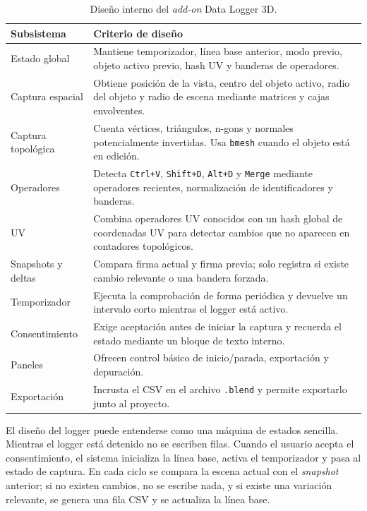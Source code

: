 \begin{table}[H]
\centering
\scriptsize
\renewcommand{\arraystretch}{1.15}
\begin{tabularx}{\textwidth}{p{3.6cm}X}
\toprule
\textbf{Subsistema} & \textbf{Criterio de diseño} \\
\midrule
Estado global & Mantiene temporizador, línea base anterior, modo previo, objeto activo previo, hash UV y banderas de operadores. \\
Captura espacial & Obtiene posición de la vista, centro del objeto activo, radio del objeto y radio de escena mediante matrices y cajas envolventes. \\
Captura topológica & Cuenta vértices, triángulos, n-gons y normales potencialmente invertidas. Usa \texttt{bmesh} cuando el objeto está en edición. \\
Operadores & Detecta \texttt{Ctrl+V}, \texttt{Shift+D}, \texttt{Alt+D} y \texttt{Merge} mediante operadores recientes, normalización de identificadores y banderas. \\
UV & Combina operadores UV conocidos con un hash global de coordenadas UV para detectar cambios que no aparecen en contadores topológicos. \\
Snapshots y deltas & Compara firma actual y firma previa; solo registra si existe cambio relevante o una bandera forzada. \\
Temporizador & Ejecuta la comprobación de forma periódica y devuelve un intervalo corto mientras el logger está activo. \\
Consentimiento & Exige aceptación antes de iniciar la captura y recuerda el estado mediante un bloque de texto interno. \\
Paneles & Ofrecen control básico de inicio/parada, exportación y depuración. \\
Exportación & Incrusta el CSV en el archivo \texttt{.blend} y permite exportarlo junto al proyecto. \\
\bottomrule
\end{tabularx}
\caption{Diseño interno del \textit{add-on} Data Logger 3D.}
\label{tab:c-diseno-logger}
\end{table}

El diseño del logger puede entenderse como una máquina de estados sencilla. Mientras el logger está detenido no se escriben filas. Cuando el usuario acepta el consentimiento, el sistema inicializa la línea base, activa el temporizador y pasa al estado de captura. En cada ciclo se compara la escena actual con el \textit{snapshot} anterior; si no existen cambios, no se escribe nada, y si existe una variación relevante, se genera una fila CSV y se actualiza la línea base.

